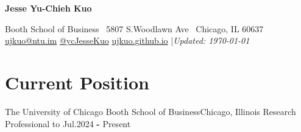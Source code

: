 \documentclass{smoothThemeCV}
\newlength{\hvspace}
\begin{document}
\begin{center}
    \noindent\textbf{\LARGE Jesse Yu-Chieh Kuo} \\
\end{center}
\vspace{\hvspace}
\hline
\vspace{\hvspace}
\begin{center}
    \noindent Booth School of Business \textbullet\ 5807 S.\@ Woodlawn Ave \textbullet\ Chicago, IL 60637 \\
    \noindent\faEnvelopeO\enskip \href{mailto:ujkuo@ntu.im}{ujkuo@ntu.im}\enskip
    \faTwitter\enskip\href{https://twitter.com/ycJesseKuo}{@ycJesseKuo}\enskip
    \faGlobe\enskip\href{https://ujkuo.github.io}{ujkuo.github.io}\enskip
    |\enskip \textit{Updated: \today} \\
\end{center}
\vspace{\hvspace}
\hline
\vspace{-10pt}

\section*{Current Position}
\resumeSubHeadingListStart

\resumeSubheading
{The University of Chicago Booth School of Business}{Chicago, Illinois}
{Research Professional to }
{Jul.\@ 2024 \textbf{-} Present} 

\resumeSubHeadingListEnd










\end{document}
